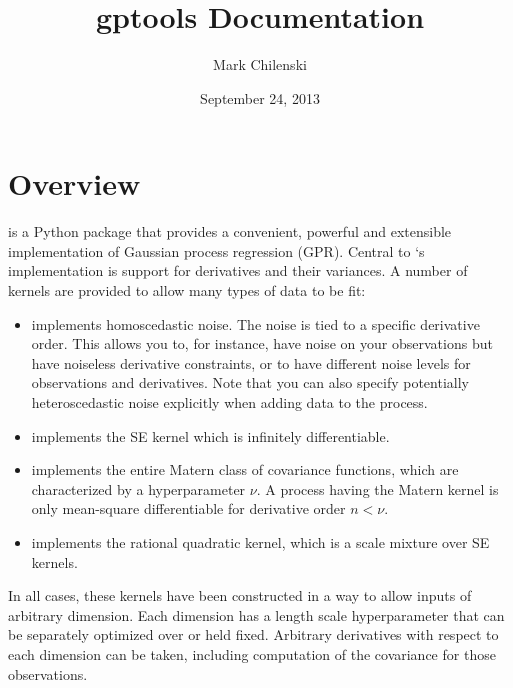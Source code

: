 \documentclass[letterpaper,10pt,english]{sphinxmanual}
\title{gptools Documentation}
\date{September 24, 2013}
\author{Mark Chilenski}
\begin{document}
\maketitle
\tableofcontents
{}\label{index::doc}



\chapter{Overview}
\label{index:overview}\label{index:gptools-gaussian-process-regression-with-support-for-arbitrary-derivatives}
 is a Python package that provides a convenient, powerful and extensible implementation of Gaussian process regression (GPR). Central to `s implementation is support for derivatives and their variances. A number of kernels are provided to allow many types of data to be fit:
\begin{itemize}
\item {} 
{\hyperref[gptools.kernel:gptools.kernel.noise.DiagonalNoiseKernel]{}} implements homoscedastic noise. The noise is tied to a specific derivative order. This allows you to, for instance, have noise on your observations but have noiseless derivative constraints, or to have different noise levels for observations and derivatives. Note that you can also specify potentially heteroscedastic noise explicitly when adding data to the process.

\item {} 
{\hyperref[gptools.kernel:gptools.kernel.squared_exponential.SquaredExponentialKernel]{}} implements the SE kernel which is infinitely differentiable.

\item {} 
{\hyperref[gptools.kernel:gptools.kernel.matern.MaternKernel]{}} implements the entire Matern class of covariance functions, which are characterized by a hyperparameter $\nu$. A process having the Matern kernel is only mean-square differentiable for derivative order $n<\nu$.

\item {} 
{\hyperref[gptools.kernel:gptools.kernel.rational_quadratic.RationalQuadraticKernel]{}} implements the rational quadratic kernel, which is a scale mixture over SE kernels.

\end{itemize}

In all cases, these kernels have been constructed in a way to allow inputs of arbitrary dimension. Each dimension has a length scale hyperparameter that can be separately optimized over or held fixed. Arbitrary derivatives with respect to each dimension can be taken, including computation of the covariance for those observations.
\end{document}
